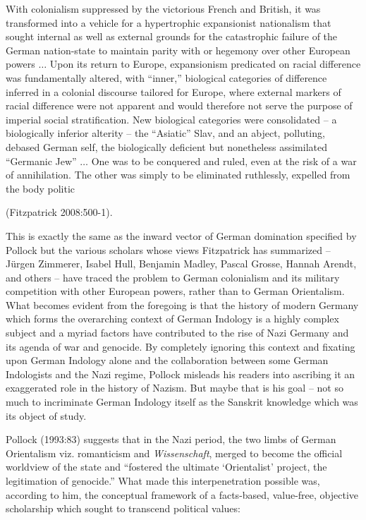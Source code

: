 \begin{myquote}
With colonialism suppressed by the victorious French and British, it was transformed into a vehicle for a hypertrophic expansionist nationalism that sought internal as well as external grounds for the catastrophic failure of the German nation-state to maintain parity with or hegemony over other European powers $\ldots$ Upon its return to Europe, expansionism predicated on racial difference was fundamentally altered, with “inner,” biological categories of difference inferred in a colonial discourse tailored for Europe, where external markers of racial difference were not apparent and would therefore not serve the purpose of imperial social stratification. New biological categories were consolidated – a biologically inferior alterity – the “Asiatic” Slav, and an abject, polluting, debased German self, the biologically deficient but nonetheless assimilated “Germanic Jew” $\ldots$ One was to be conquered and ruled, even at the risk of a war of annihilation. The other was simply to be eliminated ruthlessly, expelled from the body politic

\hfill(Fitzpatrick 2008:500-1).
\end{myquote}

This is exactly the same as the inward vector of German domination specified by Pollock but the various scholars whose views Fitzpatrick has summarized – Jürgen  Zimmerer, Isabel Hull, Benjamin Madley, Pascal Grosse,  Hannah Arendt, and others – have traced the problem to German colonialism and its military competition with  other European powers, rather than to German Orientalism. What becomes evident from the foregoing is that the history of modern Germany which forms the overarching context of German Indology is a highly complex subject and a myriad factors have contributed to the rise of Nazi Germany and its agenda of war and genocide. By completely ignoring this context and fixating upon German Indology alone and the collaboration between some German Indologists and the Nazi regime, Pollock misleads his readers into ascribing it an exaggerated role in the history of Nazism. But maybe that is his goal – not so much to incriminate German Indology itself as the Sanskrit knowledge which was its object of study.

Pollock (1993:83) suggests that in the Nazi period, the two limbs of German Orientalism viz. romanticism and {\sl Wissenschaft}, merged to become the official worldview of the state and “fostered the ultimate ‘Orientalist’ project, the legitimation of genocide.” What made this interpenetration possible was, according to him, the conceptual framework of a facts-based, value-free, objective scholarship  which sought to transcend political values: 


